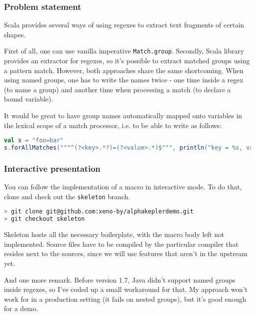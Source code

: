 \documentclass[hyperref={bookmarks=false}]{beamer}
\begin{document}
\begin{frame}[t,fragile]
\frametitle{Problem statement}

Scala provides several ways of using regexes to extract text fragments of certain shapes.

First of all, one can use vanilla imperative \texttt{Match.group}. Secondly, Scala library provides an extractor for regexes, so it's possible to extract matched groups using a pattern match. However, both approaches share the same shortcoming. When using named groups, one has to write the names twice - one time inside a regex (to name a group) and another time when processing a match (to declare a bound variable).

It would be great to have group names automatically mapped onto variables in the lexical scope of a match processor, i.e. to be able to write as follows:

\begin{lstlisting}[language=scala]
val s = "foo=bar"
s.forAllMatches("""^(?<key>.*?)=(?<value>.*)$""", println("key = %s, value = %s".format(key, value)))
\end{lstlisting}%
\end{frame}

\begin{frame}[t,fragile]
\frametitle{Interactive presentation}

You can follow the implementation of a macro in interactive mode. To do that, clone  and check out the \texttt{skeleton} branch.

\begin{lstlisting}[language=bash]
> git clone git@github.com:xeno-by/alphakeplerdemo.git
> git checkout skeleton
\end{lstlisting}

Skeleton hosts all the necessary boilerplate, with the macro body left not implemented. Source files have to be compiled by the particular compiler that resides next to the sources, since we will use features that aren't in the upstream yet.

And one more remark. Before version 1.7, Java didn't support named groups inside regexes, so I've coded up a small workaround for that. My approach won't work for in a production setting (it fails on nested groups), but it's good enough for a demo.
\end{frame}
\end{document}
